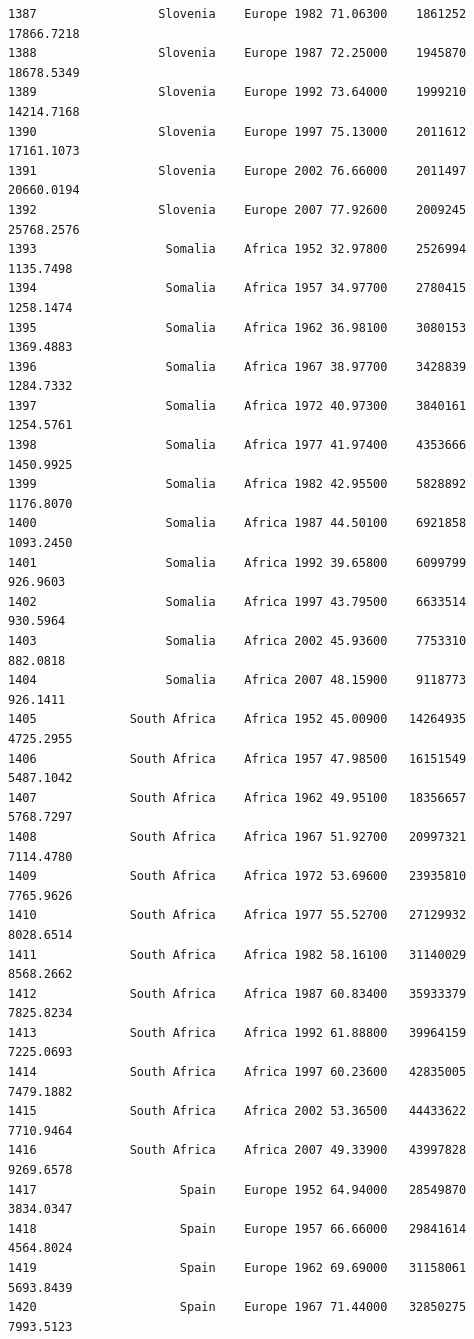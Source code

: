 \documentclass[
  letterpaper,
  DIV=11,
  numbers=noendperiod]{scrreprt}
\begin{document}
\begin{verbatim}
1387                 Slovenia    Europe 1982 71.06300    1861252  17866.7218
1388                 Slovenia    Europe 1987 72.25000    1945870  18678.5349
1389                 Slovenia    Europe 1992 73.64000    1999210  14214.7168
1390                 Slovenia    Europe 1997 75.13000    2011612  17161.1073
1391                 Slovenia    Europe 2002 76.66000    2011497  20660.0194
1392                 Slovenia    Europe 2007 77.92600    2009245  25768.2576
1393                  Somalia    Africa 1952 32.97800    2526994   1135.7498
1394                  Somalia    Africa 1957 34.97700    2780415   1258.1474
1395                  Somalia    Africa 1962 36.98100    3080153   1369.4883
1396                  Somalia    Africa 1967 38.97700    3428839   1284.7332
1397                  Somalia    Africa 1972 40.97300    3840161   1254.5761
1398                  Somalia    Africa 1977 41.97400    4353666   1450.9925
1399                  Somalia    Africa 1982 42.95500    5828892   1176.8070
1400                  Somalia    Africa 1987 44.50100    6921858   1093.2450
1401                  Somalia    Africa 1992 39.65800    6099799    926.9603
1402                  Somalia    Africa 1997 43.79500    6633514    930.5964
1403                  Somalia    Africa 2002 45.93600    7753310    882.0818
1404                  Somalia    Africa 2007 48.15900    9118773    926.1411
1405             South Africa    Africa 1952 45.00900   14264935   4725.2955
1406             South Africa    Africa 1957 47.98500   16151549   5487.1042
1407             South Africa    Africa 1962 49.95100   18356657   5768.7297
1408             South Africa    Africa 1967 51.92700   20997321   7114.4780
1409             South Africa    Africa 1972 53.69600   23935810   7765.9626
1410             South Africa    Africa 1977 55.52700   27129932   8028.6514
1411             South Africa    Africa 1982 58.16100   31140029   8568.2662
1412             South Africa    Africa 1987 60.83400   35933379   7825.8234
1413             South Africa    Africa 1992 61.88800   39964159   7225.0693
1414             South Africa    Africa 1997 60.23600   42835005   7479.1882
1415             South Africa    Africa 2002 53.36500   44433622   7710.9464
1416             South Africa    Africa 2007 49.33900   43997828   9269.6578
1417                    Spain    Europe 1952 64.94000   28549870   3834.0347
1418                    Spain    Europe 1957 66.66000   29841614   4564.8024
1419                    Spain    Europe 1962 69.69000   31158061   5693.8439
1420                    Spain    Europe 1967 71.44000   32850275   7993.5123

\end{verbatim}
\end{document}
